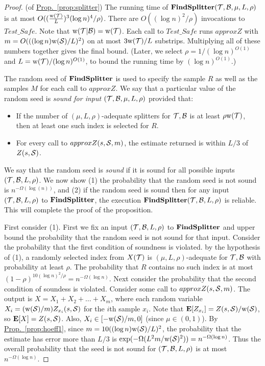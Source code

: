 \documentclass{acmsmall}
\newcommand{\cB}{{\cal B}}
\newcommand{\cS}{{\cal S}}
\newcommand{\cT}{{\cal T}}
\newcommand{\Prop}[1]{\hyperref[prop:#1]{Prop.~\ref*{prop:#1}}} %
\newcommand{\EX}{\hbox{\bf E}}
\newcommand{\strip}[2]{#1|#2}
\newcommand{\width}{{\bf {\rm  w}}}
\newcommand{\findsplitter}{{\rm {\bf FindSplitter}}}
\begin{document}
\begin{proof} (of \Prop{splitter})
The running time of  $\findsplitter(\cT,\cB,\mu,L,\rho)$ is at most $O((\frac{\width(\cT)}{L})^3(\log n)^4/\rho)$.
There are $O((\log n)^2/\rho)$ invocations to $Test\_Safe$. Note that $\width(\cT|\cB) = \width(\cT)$.
Each call to $Test\_Safe$ runs $approxZ$ with $m = O(((\log n) \width(\cS)/L)^2)$ on at most $3\width(\cT)/L$ substrips.
Multiplying all of these numbers together gives the final bound.
%
(Later, we select $\rho = 1/(\log n)^{O(1)}$ and $L = \width(\cT)/(\log n)^{O(1)}$, to bound the running time by $(\log n)^{O(1)}$.)

The random seed of $\findsplitter$ is used to specify the sample $R$  as well as the samples $M$ for each
call to $approxZ$.  We say that a particular value of the
random seed is {\em sound for input $(\cT,\cB,\mu,L,\rho)$} provided that:
%
\begin{itemize}
\item If the number of  $(\mu,L,\rho)$-adequate splitters for $\cT,\cB$ is at least $\rho \width(\cT)$, 
then at least one such index is selected for $R$.
\item For every call to $approxZ(s,\cS,m)$, the estimate returned is within $L/3$ of $Z(s,\cS)$.
\end{itemize}

We say that the random seed is {\em sound} if it is sound for all possible inputs $(\cT,\cB,L,\rho)$.  We now
show (1) the probability that the random seed is not sound is $n^{-\Omega(\log(n))}$, and (2)  if the random
seed is sound then for any input $(\cT,\cB,L,\rho)$ to $\findsplitter$, 
the execution $\findsplitter(\cT,\cB,L,\rho)$ is reliable.  This will complete the proof of the  proposition.
%

First consider (1).   First we fix an input $(\cT,\cB,L,\rho)$ to $\findsplitter$ and upper bound the probability that the random seed is not
sound for that input.  Consider the probability that the first condition of soundness is violated.
 by the hypothesis of (1), a randomly selected index from $X(\cT)$ is $(\mu,L,\rho)$-adequate for $\cT,\cB$
with probability at least $\rho$.  The probability that $R$ contains no such index is at most $(1-\rho)^{10(\log n)^2/\rho}=n^{-\Omega(\log n)}$.
Next consider the probability that the second condition of soundess is violated.
 Consider some call to $approxZ(s,\cS,m)$.
The output is $X = X_1 + X_2 + \ldots + X_m$, where each random variable $X_i = (\width(\cS)/m)Z_{x_i}(s,\cS)$ for the  $i$th sample $x_i$.
Note that $\EX[Z_{x_i}] = Z(s,\cS)/\width(\cS)$, so $\EX[X] = Z(s,\cS)$. Also, $X_i \in [-\width(\cS)/m,0]$ (since $\mu \in (0,1)$).
By \Prop{hoeff1}, since $m = 10((\log n)\width(\cS)/L)^2$, the probability that
the estimate has error more than $L/3$ is $\exp(-\Omega(L^2m/\width(\cS)^2)) = n^{-\Omega(\log n)}$. Thus the overall
probability that the seed is not sound for $(\cT,\cB,L,\rho)$ is at most $n^{-\Omega(\log n)}$.


\end{proof}
\end{document}
